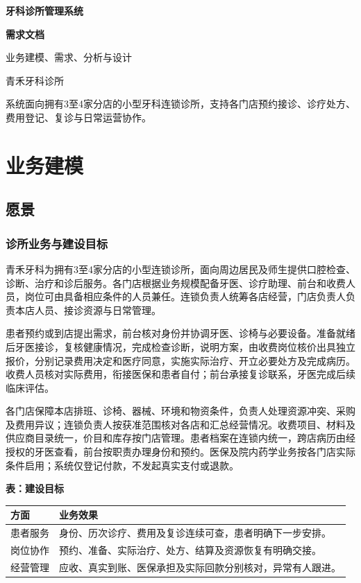 \documentclass[UTF8,a4paper,zihao=-4,fontset=none]{ctexart}
\begin{document}
\thispagestyle{empty}
\begin{center}
\vspace*{25mm}
{\bfseries 牙科诊所管理系统}\par\vspace{8mm}
{\bfseries 需求文档}\par\vspace{15mm}
{\large 业务建模、需求、分析与设计}\par\vspace{15mm}
{\large 青禾牙科诊所}\par\vspace{8mm}
\end{center}
\vfill
\noindent 系统面向拥有3至4家分店的小型牙科连锁诊所，支持各门店预约接诊、诊疗处方、费用登记、复诊与日常运营协作。
\clearpage
\tableofcontents
\clearpage
\section{业务建模}
\subsection{愿景}
\subsubsection{诊所业务与建设目标}
青禾牙科为拥有3至4家分店的小型连锁诊所，面向周边居民及师生提供口腔检查、诊断、治疗和诊后服务。各门店根据业务规模配备牙医、诊疗助理、前台和收费人员，岗位可由具备相应条件的人员兼任。连锁负责人统筹各店经营，门店负责人负责本店人员、接诊资源与日常管理。\par
患者预约或到店提出需求，前台核对身份并协调牙医、诊椅与必要设备。准备就绪后牙医接诊，复核健康情况，完成检查诊断，说明方案，由收费岗位核价出具独立报价，分别记录费用决定和医疗同意，实施实际治疗、开立必要处方及完成病历。收费人员核对实际费用，衔接医保和患者自付；前台承接复诊联系，牙医完成后续临床评估。\par
各门店保障本店排班、诊椅、器械、环境和物资条件，负责人处理资源冲突、采购及费用异议；连锁负责人按获准范围核对各店和汇总经营情况。收费项目、材料及供应商目录统一，价目和库存按门店管理。患者档案在连锁内统一，跨店病历由经授权的牙医查看，前台按职责办理身份和预约。医保及院内药学业务按各门店实际条件启用；系统仅登记付款，不发起真实支付或退款。\par
{\small\setlength{\tabcolsep}{3pt}\renewcommand{\arraystretch}{1.13}
\noindent\textbf{表\thetable：建设目标}\par\smallskip
\noindent\begin{tabular}{@{}>{\raggedright\arraybackslash}p{2.944cm}>{\raggedright\arraybackslash}p{12.756cm}@{}}
\toprule
方面 & 业务效果 \\ \midrule
患者服务 & 身份、历次诊疗、费用及复诊连续可查，患者明确下一步安排。 \\
岗位协作 & 预约、准备、实际治疗、处方、结算及资源恢复有明确交接。 \\
经营管理 & 应收、真实到账、医保承担及实际回款分别核对，异常有人跟进。 \\
\bottomrule
\end{tabular}\par}
\medskip
\end{document}
